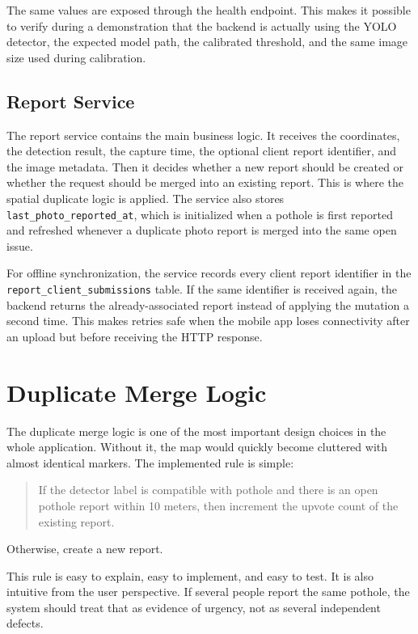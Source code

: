 The same values are exposed through the health endpoint. This makes it possible to verify during a demonstration that the backend is actually using the YOLO detector, the expected model path, the calibrated threshold, and the same image size used during calibration.

\subsection{Report Service}

The report service contains the main business logic. It receives the coordinates, the detection result, the capture time, the optional client report identifier, and the image metadata. Then it decides whether a new report should be created or whether the request should be merged into an existing report. This is where the spatial duplicate logic is applied. The service also stores \texttt{last\_photo\_reported\_at}, which is initialized when a pothole is first reported and refreshed whenever a duplicate photo report is merged into the same open issue.

For offline synchronization, the service records every client report identifier in the \texttt{report\_client\_submissions} table. If the same identifier is received again, the backend returns the already-associated report instead of applying the mutation a second time. This makes retries safe when the mobile app loses connectivity after an upload but before receiving the HTTP response.

\section{Duplicate Merge Logic}

The duplicate merge logic is one of the most important design choices in the whole application. Without it, the map would quickly become cluttered with almost identical markers. The implemented rule is simple:

\begin{quote}
If the detector label is compatible with pothole and there is an open pothole report within 10 meters, then increment the upvote count of the existing report.
\end{quote}

Otherwise, create a new report.

This rule is easy to explain, easy to implement, and easy to test. It is also intuitive from the user perspective. If several people report the same pothole, the system should treat that as evidence of urgency, not as several independent defects.

